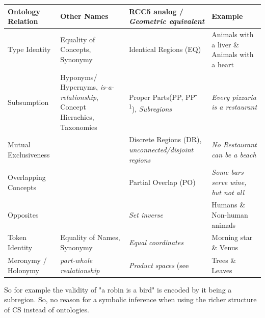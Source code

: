 \begin{tabularx}{1.05\textwidth}{P{0.16\textwidth}|P{0.25\textwidth}|P{0.25\textwidth}|X}
    Ontology Relation & Other Names        & RCC5 \cite{Cohn1997a} analog / \textit{Geometric equivalent} & Example \\ \midrule

    Type Identity     & {\scriptsize Equality of Concepts, Synonymy } & Identical Regions (EQ)      & Animals with a liver \& Animals with a heart \\ 

    Subsumption       & {\scriptsize Hyponyms/ Hypernyms, \textit{is-a-relationship}, Concept Hierachies, Taxonomies }
                                           & Proper Parts(PP, PP\textsuperscript{-1}), \textit{Subregions}
                                                                          & \textit{Every pizzaria is a restaurant} \\  
    
    Mutual 
    Exclusiveness     &                    & Discrete Regions (DR), \textit{unconnected/disjoint regions}
                                                                          & \textit{No Restaurant can be a beach} \\  

    Overlapping 
    Concepts          &                    & Partial Overlap (PO)         & \textit{Some bars serve wine, but not all} \\  

    Opposites         &                    & \textit{Set inverse}         & Humans \& Non-human animals \\ 

    Token Identity    & {\scriptsize Equality of Names, Synonymy } & \textit{Equal coordinates}   & Morning star \& Venus \\ 
    Meronymy / Holonymy & {\scriptsize \textit{part-whole realationship} }& \textit{Product spaces} (see \cite{Fiorini2013}        & Trees \& Leaves
\end{tabularx}

\vspace{4ex}


So for example the validity of "a robin is a bird" is encoded by it being a subregion. So, no reason for a symbolic inference when using the richer structure of CS instead of ontologies.

